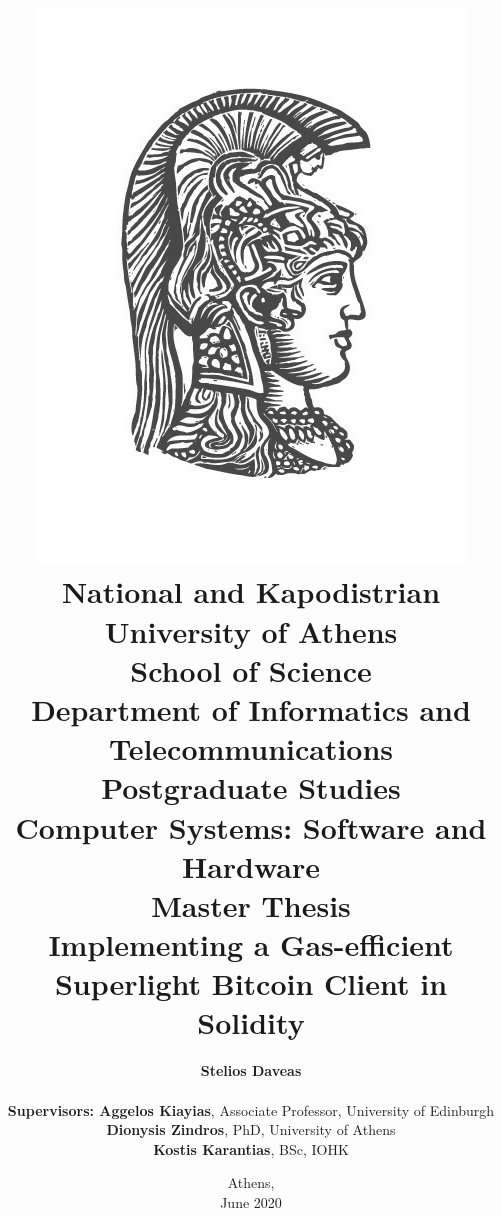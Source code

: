 \title{
    {\includegraphics[scale=0.8]{figures/logo_uoa.jpg}}\\
    {\large National and Kapodistrian University of Athens \\
    School of Science \\
    Department of Informatics and Telecommunications}\\
    \vspace{1cm}
    Postgraduate Studies \\
    Computer Systems: Software and Hardware\\
    \vspace{10mm}
    {Master Thesis}\\
    \vspace{3mm}
    {\textbf{\LARGE Implementing a Gas-efficient\\Superlight Bitcoin Client in Solidity}}
    }

\author{
    \textbf{Stelios Daveas} \\
    \vspace{1cm} \\
    \textbf{Supervisors: Aggelos Kiayias}, Associate Professor, University of Edinburgh\\
    \hspace{-0.60cm}
    \textbf{Dionysis Zindros}, PhD, University of Athens\\
    \hspace{-3.70cm}
    \textbf{Kostis Karantias}, BSc, IOHK
    \vspace{2cm}
}

\date{Athens, \\ June 2020}
